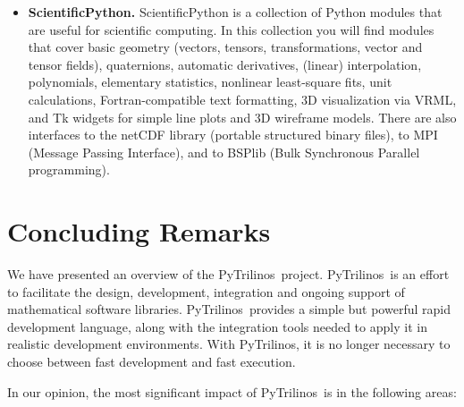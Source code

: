 \documentclass[10pt,relax]{SANDreport}
\newcommand{\PyTrilinos}{{PyTrilinos}}
\newcommand{\note}[1]{\begin{center}\fbox{\bf #1}\end{center}}
\begin{document}
\begin{itemize}
\item {\bf ScientificPython.}  ScientificPython is a collection of
  Python modules that are useful for scientific computing. In this
  collection you will find modules that cover basic geometry (vectors,
  tensors, transformations, vector and tensor fields), quaternions,
  automatic derivatives, (linear) interpolation, polynomials,
  elementary statistics, nonlinear least-square fits, unit
  calculations, Fortran-compatible text formatting, 3D visualization
  via VRML, and Tk widgets for simple line plots and 3D wireframe
  models. There are also interfaces to the netCDF library (portable
  structured binary files), to MPI (Message Passing Interface), and to
  BSPlib (Bulk Synchronous Parallel programming).

  \note{ This is a big project!!!!}

\end{itemize}

%
\section{Concluding Remarks}
\label{sec:concluding}

We have presented an overview of the
\PyTrilinos\ project. \PyTrilinos\ is an effort to facilitate the
design, development, integration and ongoing support of mathematical
software libraries.  \PyTrilinos\ provides a simple but powerful rapid
development language, along with the integration tools needed to apply
it in realistic development environments. With \PyTrilinos, it is no
longer necessary to choose between fast development and fast
execution.

In our opinion, the most significant impact of \PyTrilinos\ is in the
following areas:
\end{document}
